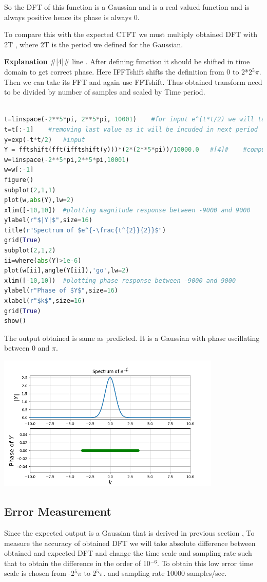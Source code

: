 \documentclass[a4paper]{article}
\begin{document}
So the DFT of this function is a Gaussian and is a real valued function and is always positive hence its phase is always 0.

To compare this with the expected CTFT we must multiply obtained DFT with 2T , where 2T is the period we defined for the Gaussian.

\textbf{Explanation} \#[4]\# line . After defining function it should be shifted in time domain to get correct phase. Here IFFTshift shifts the definition from 0 to 2*2$^{5}\pi$. Then we can take its FFT and again use FFTshift. Thus obtained transform need to be divided by number of samples and scaled by Time period. 
\begin{lstlisting}[language=Python]

t=linspace(-2**5*pi, 2**5*pi, 10001)	#for input e^(t*t/2) we will take time from 0 to 2pi
t=t[:-1]	#removing last value as it will be incuded in next period
y=exp(-t*t/2)	#input
Y = fftshift(fft(ifftshift(y)))*(2*(2**5*pi))/10000.0	#[4]#	 #computing fft and deviding by the scaling factor N.
w=linspace(-2**5*pi,2**5*pi,10001)
w=w[:-1]
figure()
subplot(2,1,1)
plot(w,abs(Y),lw=2)
xlim([-10,10])	#plotting magnitude response between -9000 and 9000
ylabel(r"$|Y|$",size=16)
title(r"Spectrum of $e^{-\frac{t^{2}}{2}}$")
grid(True)
subplot(2,1,2)
ii=where(abs(Y)>1e-6)
plot(w[ii],angle(Y[ii]),'go',lw=2)
xlim([-10,10])	#plotting phase response between -9000 and 9000
ylabel(r"Phase of $Y$",size=16)
xlabel(r"$k$",size=16)
grid(True)
show()
\end{lstlisting}
The output obtained is same as predicted. It is a Gaussian with phase oscillating between 0 and $\pi$.
\begin{center}
\includegraphics[width=0.8\textwidth]{Figure_7.png}
\end{center}
\subsection{Error Measurement}
Since the expected output is a Gaussian that is derived in previous section , To measure the accuracy of obtained DFT we will take absolute difference between obtained and expected DFT and change the time scale and sampling rate such that to obtain the difference in the order of 10$^{-6}$. To obtain this low error time scale is chosen from -2$^{5}\pi$ to 2$^{5}\pi$. and sampling rate 10000 samples/sec.
\end{document}
